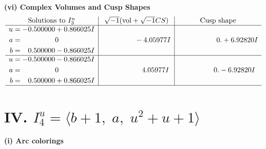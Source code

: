 \documentclass[1p]{elsarticle_modified}
\theoremstyle{definition}
\newcommand{\I}{\sqrt{-1}}
\begin{document}
\newpage\flushleft \textbf{(vi) Complex Volumes and Cusp Shapes}
$$\begin{array}{c|c|c}  
\text{Solutions to }I^u_{3}& \I (\text{vol} + \sqrt{-1}CS) & \text{Cusp shape}\\
 \hline 
\begin{aligned}
u &= -0.500000 + 0.866025 I \\
a &= \phantom{-0.000000 } 0 \\
b &= \phantom{-}0.500000 - 0.866025 I\end{aligned}
 & \phantom{-0.000000 } -4.05977 I & \phantom{-0.000000 -}0. + 6.92820 I \\ \hline\begin{aligned}
u &= -0.500000 - 0.866025 I \\
a &= \phantom{-0.000000 } 0 \\
b &= \phantom{-}0.500000 + 0.866025 I\end{aligned}
 & \phantom{-0.000000 -}4.05977 I & \phantom{-0.000000 } 0. - 6.92820 I\\
 \hline 
 \end{array}$$\newpage\newpage\renewcommand{\arraystretch}{1}
\centering \section*{IV. $I^u_{4}= \langle b+1,\;a,\;u^2+u+1 \rangle$}
\flushleft \textbf{(i) Arc colorings}\\
\end{document}
